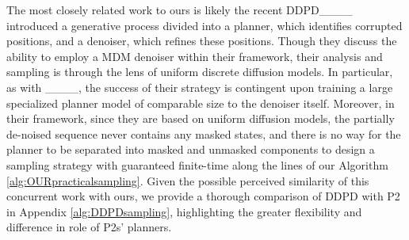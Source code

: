 The most closely related work to ours is likely the recent
DDPD____ introduced a generative process divided into a planner, which identifies corrupted positions, and a denoiser, which refines these positions. Though they discuss the ability to employ a MDM denoiser within their framework, their analysis and sampling is through the lens of uniform discrete diffusion models. In particular, as with ____, the success of their strategy is contingent upon training a large specialized planner model of comparable size to the denoiser itself. Moreover, in their framework, since they are based on uniform diffusion models, the partially de-noised sequence never contains any masked states, and there is no way for the planner to be separated into masked and unmasked components to design a sampling strategy with guaranteed finite-time along the lines of our Algorithm \ref{alg:OURpracticalsampling}. Given the possible perceived similarity of this concurrent work with ours, we provide a thorough comparison of DDPD with P2 in Appendix \ref{alg:DDPDsampling}, highlighting the greater flexibility and difference in role of P2s' planners.
 



